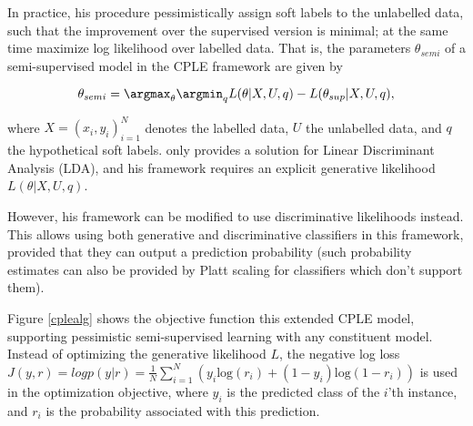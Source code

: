 In practice, his procedure pessimistically assign soft labels to the unlabelled data, such that the improvement over the supervised version is minimal; at the same time maximize log likelihood over labelled data. That is, the parameters $\theta_{semi}$ of a semi-supervised model in the CPLE framework are given by

\begin{equation}
\label{eq:cple}
\theta_{semi} = \argmax_\theta \argmin_q L(\theta|X,U,q) - L(\theta_{sup}|X,U,q),
\end{equation}

where $X={(x_i,y_i)}_{i=1}^N$ denotes the labelled data, $U$ the unlabelled data, and $q$ the hypothetical soft labels. \citep{loog2015contrastive} only provides a solution for Linear Discriminant Analysis (LDA), and his framework requires an explicit generative likelihood $L(\theta|X,U,q)$.

However, his framework can be modified to use discriminative likelihoods instead. This allows using both generative and discriminative classifiers in this framework, provided that they can output a prediction probability (such probability estimates can also be provided by Platt scaling \citep{platt1999probabilistic} for classifiers which don't support them). 

Figure \ref{cplealg} shows the objective function this extended CPLE model, supporting pessimistic semi-supervised learning with any constituent model. Instead of optimizing the generative likelihood $L$, the negative log loss $J(y,r)=log p(y|r)=\frac{1}{N} \sum_{i=1}^N (y_i \text{log} (r_i) + (1-y_i) \text{log} (1-r_i))$ is used in the optimization objective, where $y_i$ is the predicted class of the $i$'th instance, and $r_i$ is the probability associated with this prediction.

